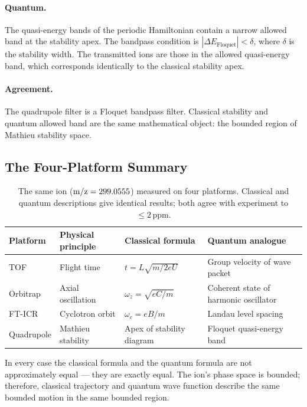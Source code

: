 \paragraph{Quantum.}
The quasi-energy bands of the periodic Hamiltonian contain a narrow allowed
band at the stability apex.
The bandpass condition is $|\Delta E_\mathrm{Floquet}| < \delta$, where
$\delta$ is the stability width.
The transmitted ions are those in the allowed quasi-energy band, which
corresponds identically to the classical stability apex.

\paragraph{Agreement.}
The quadrupole filter is a Floquet bandpass filter.
Classical stability and quantum allowed band are the same mathematical object:
the bounded region of Mathieu stability space.

\subsection{The Four-Platform Summary}
\label{sec:ch1-fourplatform}

\begin{table}[htbp]
\centering
\caption{%
  The same ion ($\operatorname{m/z} = 299.0555$) measured on four platforms.
  Classical and quantum descriptions give identical results; both agree with
  experiment to $\leq 2\,\mathrm{ppm}$.
}
\label{tab:four-platforms}
\begin{tabular}{@{}llll@{}}
\toprule
Platform & Physical principle & Classical formula & Quantum analogue \\
\midrule
TOF      & Flight time        & $t = L\sqrt{m/2eU}$ & Group velocity of wave packet \\
Orbitrap & Axial oscillation  & $\omega_z = \sqrt{eC/m}$ & Coherent state of harmonic oscillator \\
FT-ICR   & Cyclotron orbit    & $\omega_c = eB/m$ & Landau level spacing \\
Quadrupole & Mathieu stability & Apex of stability diagram & Floquet quasi-energy band \\
\bottomrule
\end{tabular}
\end{table}

In every case the classical formula and the quantum formula are not
approximately equal --- they are exactly equal.
The ion's phase space is bounded; therefore, classical trajectory and quantum
wave function describe the same bounded motion in the same bounded region.

